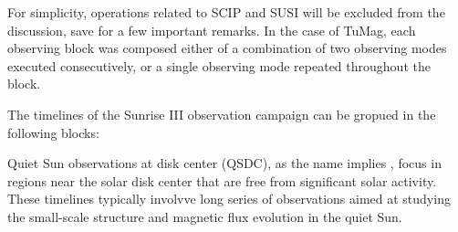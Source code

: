 For simplicity, operations related to SCIP and SUSI will be excluded from the discussion, save for a few important remarks. In the case of TuMag, each observing block was composed either of a combination of two observing modes executed consecutively, or a single observing mode repeated throughout the block.  

The timelines of the Sunrise III observation campaign can be gropued in the following blocks: 

\begin{itemize}
  \Myitem Quiet Sun observations at disk center (QSDC), as the name implies , focus in regions near the solar disk center that are free from significant solar activity. These timelines typically involvve long series of observations aimed at studying the small-scale structure and magnetic flux evolution in the quiet Sun. 
  

\end{itemize}
